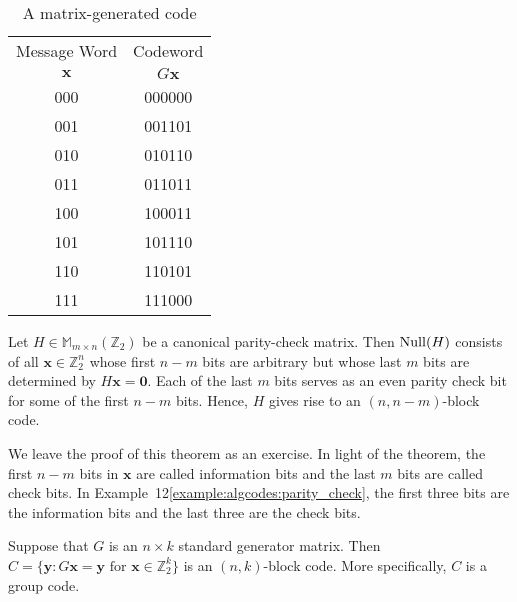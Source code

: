  
\begin{table}[htb]
{\small
\begin{center}
\begin{tabular}{|c|c|}
\hline
Message Word  & Codeword \\
${\mathbf x}$ & $G {\mathbf x}$ \\ \hline
000 & 000000 \\
001 & 001101 \\
010 & 010110 \\
011 & 011011 \\
100 & 100011 \\
101 & 101110 \\
110 & 110101 \\
111 & 111000 \\
\hline
\end{tabular}
\end{center}\label{matrix_gen_code}
}
\caption{A matrix-generated code}
\end{table}
 
 
\begin{theorem}
Let $H \in {\mathbb M}_{m \times n}({\mathbb Z}_2)$ be a canonical
parity-check matrix. Then ${\rm Null}(H)$ consists of all 
${\mathbf x} \in {\mathbb
Z}_2^n$ whose first $n-m$ bits are arbitrary but whose last $m$ bits
are determined by $H{\mathbf x} = {\mathbf 0}$. Each of
the last $m$ bits serves as an even parity check bit for some of the
first $n-m$ bits. Hence, $H$ gives rise to an $(n, n-m)$-block code. 
\end{theorem}
 
 
We leave the proof of this theorem as an exercise. In light of the
theorem, the first $n - m$ bits in ${\mathbf x}$ are called {\bfi
information bits\/} and the last $m$ bits are called {\bfi check bits}.
In Example~12\ref{example:algcodes:parity_check},  %
the first three bits are the information bits
and the last three are the check bits.
 
 
\begin{theorem}
Suppose that $G$ is an $n \times k$  standard generator matrix.  Then
\mbox{$C = \{ {\mathbf y} : G {\mathbf x} ={\mathbf y} \mbox{ for ${\mathbf x} \in
{\mathbb  Z}_2^k$} \}$} is an  $(n,k)$-block code. More specifically, $C$
is a group code.  
\end{theorem}
 
